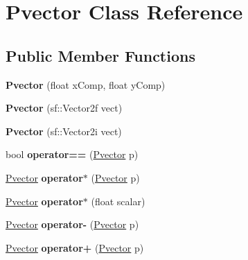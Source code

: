 \hypertarget{class_pvector}{}\section{Pvector Class Reference}
\label{class_pvector}
\subsection*{Public Member Functions}
\begin{DoxyCompactItemize}
\item 
{\bfseries Pvector} (float x\+Comp, float y\+Comp)\hypertarget{class_pvector_ada1a9423d48f67838d625ddf62149bcf}{}\label{class_pvector_ada1a9423d48f67838d625ddf62149bcf}

\item 
{\bfseries Pvector} (sf\+::\+Vector2f vect)\hypertarget{class_pvector_a5db381ad4447edd52a268673fe90c39d}{}\label{class_pvector_a5db381ad4447edd52a268673fe90c39d}

\item 
{\bfseries Pvector} (sf\+::\+Vector2i vect)\hypertarget{class_pvector_a989cad71b277deac54e0e6c6773f080e}{}\label{class_pvector_a989cad71b277deac54e0e6c6773f080e}

\item 
bool {\bfseries operator==} (\hyperlink{class_pvector}{Pvector} p)\hypertarget{class_pvector_a14dd00c152cdc2a22a4ebd2583c007ec}{}\label{class_pvector_a14dd00c152cdc2a22a4ebd2583c007ec}

\item 
\hyperlink{class_pvector}{Pvector} {\bfseries operator$\ast$} (\hyperlink{class_pvector}{Pvector} p)\hypertarget{class_pvector_ab3356246f3b14565b0e08b4b52c5a375}{}\label{class_pvector_ab3356246f3b14565b0e08b4b52c5a375}

\item 
\hyperlink{class_pvector}{Pvector} {\bfseries operator$\ast$} (float scalar)\hypertarget{class_pvector_ad2bf0bcb3c564349ac16c49ffc8ef826}{}\label{class_pvector_ad2bf0bcb3c564349ac16c49ffc8ef826}

\item 
\hyperlink{class_pvector}{Pvector} {\bfseries operator-\/} (\hyperlink{class_pvector}{Pvector} p)\hypertarget{class_pvector_a6571f6fdf1a5168eba5604d86f6ae9fd}{}\label{class_pvector_a6571f6fdf1a5168eba5604d86f6ae9fd}

\item 
\hyperlink{class_pvector}{Pvector} {\bfseries operator+} (\hyperlink{class_pvector}{Pvector} p)\hypertarget{class_pvector_a42adb3238a887b3c3048a480c3cd927e}{}\label{class_pvector_a42adb3238a887b3c3048a480c3cd927e}


\end{DoxyCompactItemize}
